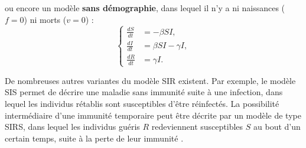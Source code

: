 	ou encore un modèle \textbf{sans démographie}, dans lequel il n'y a ni naissances ($f=0$) ni morts ($v=0$) : 
	\begin{equation}
		\left\{
		\begin{aligned}
			\frac{dS}{dt} &=-\beta SI,\\
			\frac{dI}{dt} &= \beta SI - \gamma I, \\         
			\frac{dR}{dt} &= \gamma I.
		\end{aligned}
		\right.
		\label{eq:SIR-nodemo}
	\end{equation}
	
	De nombreuses autres variantes du modèle SIR existent.  Par exemple, le modèle SIS permet de décrire une maladie sans immunité suite à une infection, dans lequel les individus rétablis sont susceptibles d'être réinfectés.  La possibilité intermédiaire d'une immunité temporaire peut être décrite par un modèle de type SIRS, dans lequel les individus guéris $R$ redeviennent susceptibles $S$ au bout d'un certain temps, suite à la perte de leur immunité \citep{Brauer2012}.
	
